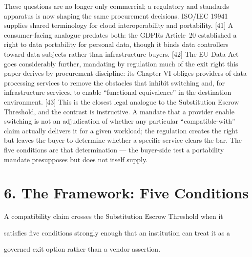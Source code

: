 \documentclass[11pt]{article}
\begin{document}
These questions are no longer only commercial; a regulatory and standards apparatus is now shaping the same procurement decisions. ISO/IEC 19941 supplies shared terminology for cloud interoperability and portability. {[}41{]} A consumer-facing analogue predates both: the GDPR\textquotesingle s Article~20 established a right to data portability for personal data, though it binds data controllers toward data subjects rather than infrastructure buyers. {[}42{]} The EU Data Act goes considerably further, mandating by regulation much of the exit right this paper derives by procurement discipline: its Chapter VI obliges providers of data processing services to remove the obstacles that inhibit switching and, for infrastructure services, to enable ``functional equivalence'' in the destination environment. {[}43{]} This is the closest legal analogue to the Substitution Escrow Threshold, and the contrast is instructive. A mandate that a provider enable switching is not an adjudication of whether any particular ``compatible-with'' claim actually delivers it for a given workload; the regulation creates the right but leaves the buyer to determine whether a specific service clears the bar. The five conditions are that determination --- the buyer-side test a portability mandate presupposes but does not itself supply.

\section{6. The Framework: Five Conditions}\label{the-framework-five-conditions}

A compatibility claim crosses the Substitution Escrow Threshold when it

satisfies five conditions strongly enough that an institution can treat it as a

governed exit option rather than a vendor assertion.
\end{document}
